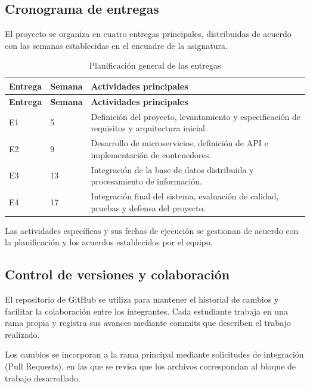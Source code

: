 \subsection{Cronograma de entregas}

El proyecto se organiza en cuatro entregas principales, distribuidas de acuerdo con las semanas establecidas en el encuadre de la asignatura.

\begin{longtable}{P{0.14\textwidth} P{0.15\textwidth} P{0.58\textwidth}}
\caption{Planificación general de las entregas}\\
\toprule
\textbf{Entrega} & \textbf{Semana} & \textbf{Actividades principales}\\
\midrule
\endfirsthead

\toprule
\textbf{Entrega} & \textbf{Semana} & \textbf{Actividades principales}\\
\midrule
\endhead

E1 & 5 &
Definición del proyecto, levantamiento y especificación de requisitos y arquitectura inicial.\\

E2 & 9 &
Desarrollo de microservicios, definición de API e implementación de contenedores.\\

E3 & 13 &
Integración de la base de datos distribuida y procesamiento de información.\\

E4 & 17 &
Integración final del sistema, evaluación de calidad, pruebas y defensa del proyecto.\\

\bottomrule
\end{longtable}

Las actividades específicas y sus fechas de ejecución se gestionan de acuerdo con la planificación y los acuerdos establecidos por el equipo.

\subsection{Control de versiones y colaboración}

El repositorio de GitHub se utiliza para mantener el historial de cambios y facilitar la colaboración entre los integrantes. Cada estudiante trabaja en una rama propia y registra sus avances mediante commits que describen el trabajo realizado.

Los cambios se incorporan a la rama principal mediante solicitudes de integración (Pull Requests), en las que se revisa que los archivos correspondan al bloque de trabajo desarrollado.


